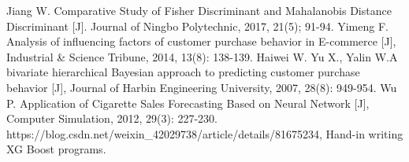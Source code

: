 \begin{thebibliography}{}
	 Jiang W. Comparative Study of Fisher Discriminant and Mahalanobis Distance Discriminant [J]. Journal of Ningbo Polytechnic, 2017, 21(5); 91-94. 
	 Yimeng F. Analysis of influencing factors of customer purchase behavior in E-commerce [J], Industrial \& Science Tribune, 2014, 13(8): 138-139. 
	 Haiwei W. Yu X., Yalin W.A bivariate hierarchical Bayesian approach to predicting customer purchase behavior [J], Journal of Harbin Engineering University, 2007, 28(8): 949-954. 
	 Wu P. Application of Cigarette Sales Forecasting Based on Neural Network [J], Computer Simulation, 2012, 29(3): 227-230. 
	 https://blog.csdn.net/weixin\_42029738/article/details/81675234, Hand-in writing XG Boost programs. 
\end{thebibliography}